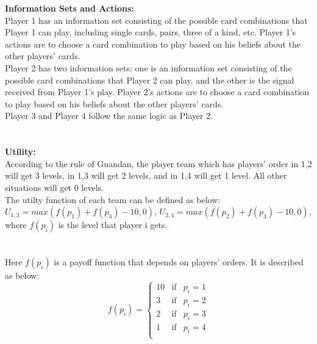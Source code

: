 \documentclass{article}
\begin{document}
\textbf{Information Sets and Actions:}\\
Player 1 has an information set consisting of the possible card combinations that Player 1 can play, including single cards, pairs, three of a kind, etc. 
Player 1's actions are to choose a card combination to play based on his beliefs about the other players' cards.\\
Player 2 has two information sets: one is an information set consisting of the possible card combinations that Player 2 can play, 
and the other is the signal received from Player 1's play. Player 2's actions are to choose a card combination to play based on his beliefs about the other players' cards.\\
Player 3 and Player 4 follow the same logic as Player 2.\\
\\ \hspace*{\fill} \\
\textbf{Utility:}\\
According to the rule of Guandan, the player team which has players' order in 1,2 will get 3 levels, in 1,3 will get 2 levels, and in 1,4 will get 1 level. All other situations will get 0 levels.\\
The utilty function of each team can be defined as below:\\
$U_{1,3} = max(f(p_1) + f(p_3) - 10, 0)$, $U_{2,4} = max(f(p_2) + f(p_4) - 10, 0)$, where $f(p_i)$ is the level that player i gets.\\
\\ \hspace*{\fill} \\
Here $f(p_i)$ is a payoff function that depends on players' orders. It is described as below:\\
\begin{equation}
    f(p_i) = \left\{
    \begin{array}{rcl}
    10 & \text{if} & p_i = 1 \\
    3 & \text{if} & p_i = 2 \\
    2 & \text{if} & p_i = 3 \\
    1 & \text{if} & p_i = 4 \\
    \end{array} \right.
\end{equation}
\end{document}
